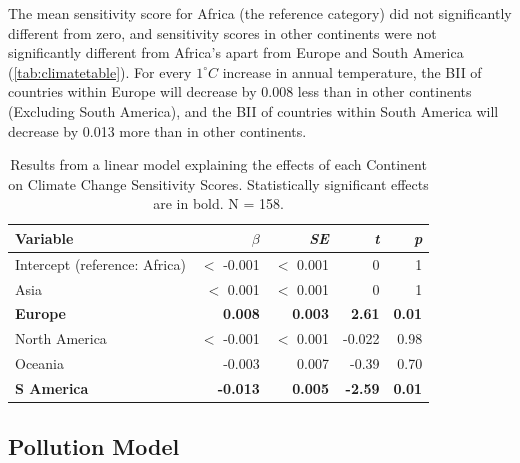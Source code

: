 \documentclass[11pt, a4paper, titlepage]{article}
\begin{document}
	The mean sensitivity score for Africa (the reference category) did not significantly different from zero, and sensitivity scores in other continents were not significantly different from Africa's apart from Europe and South America (\autoref{tab:climatetable}). For every $1^\circ C$ increase in annual temperature, the BII of countries within Europe will decrease by 0.008 less than in other continents (Excluding South America), and the BII of countries within South America will decrease by 0.013 more than in other continents.

	\newpage
	
	\begin{table}[H]
		\begin{center}
			\caption{Results from a linear model explaining the effects of each Continent on Climate Change Sensitivity Scores. \textmd{Statistically significant effects are in bold. N = 158.}}
			\label{tab:climatetable}
			\begin{tabular}{l|r|r|r|r}
				Variable & $\beta$ & \textit{SE} & \textit{t} & \textit{p}\\
				\hline
				Intercept (reference: Africa) & $<$ -0.001 & $<$ 0.001 & 0 & 1\\
				Asia & $<$ 0.001 & $<$ 0.001& 0 & 1\\
				\textbf{Europe} & \textbf{0.008} & \textbf{0.003} & \textbf{2.61} & \textbf{0.01} \\
				North America & $<$ -0.001 & $<$ 0.001 & -0.022 & 0.98\\
				Oceania & -0.003 & 0.007 & -0.39 & 0.70\\
				\textbf{S America} & \textbf{-0.013} & \textbf{0.005} & \textbf{-2.59} & \textbf{0.01}\\
			\end{tabular}
		\end{center}
	\end{table}
	

	\newpage
	
	\subsection*{Pollution Model}
	
\end{document}
